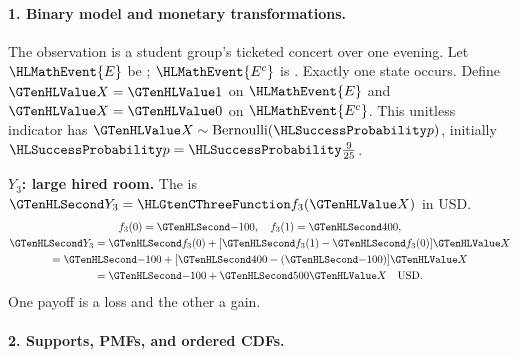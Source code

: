 \paragraph{1. Binary model and monetary transformations.}
The observation is a student group's ticketed concert over one evening. Let $\HLMathEvent{E}$ be ; $\HLMathEvent{E^c}$ is . Exactly one state occurs. Define $\Indicator{X}=\Indicator{1}$ on $\HLMathEvent{E}$ and $\Indicator{X}=\Indicator{0}$ on $\HLMathEvent{E^c}$. This unitless indicator has $\Indicator{X}\sim\operatorname{Bernoulli}(\SuccessProb{p})$, initially $\SuccessProb{p}=\SuccessProb{\frac{9}{25}}$.
\noindent\begin{minipage}[t]{.48\linewidth}
\textbf{$Y_3$: large hired room.}
The  is $\Money{Y_3}=\TransformationFunction{f_3}(\Indicator{X})$ in USD.
\[
\begin{gathered}
f_3(0)=\Money{-100},\quad f_3(1)=\Money{400},\\
\Money{Y_3}=\Money{f_3(0)}+[\Money{f_3(1)}-\Money{f_3(0)}]\Indicator{X}\\
=\Money{-100}+[\Money{400}-(\Money{-100})]\Indicator{X}\\
=\Money{-100}+\Money{500}\Indicator{X}\quad\text{USD}.
\end{gathered}
\]
One payoff is a loss and the other a gain.
\end{minipage}\par
{}\paragraph{2. Supports, PMFs, and ordered CDFs.}

